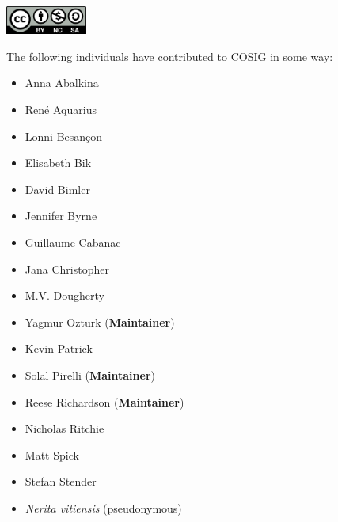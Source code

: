\documentclass[letterpaper, 12pt]{article}
\begin{document}
\includegraphics[width=0.2\textwidth]{img/home/Cc-by-nc-sa_icon.svg.png}

\pagebreak

The following individuals have contributed to COSIG in some way:

\begin{itemize}
    \setlength\itemsep{-0.5em}
    \item Anna Abalkina 
    \item Ren\'e Aquarius 
    \item Lonni Besan\c{c}on 
    \item Elisabeth Bik 
    \item David Bimler 
    \item Jennifer Byrne 
    \item Guillaume Cabanac 
    \item Jana Christopher 
    \item M.V. Dougherty 
    \item Yagmur Ozturk  (\textbf{Maintainer})
    \item Kevin Patrick 
    \item Solal Pirelli  (\textbf{Maintainer})
    \item Reese Richardson  (\textbf{Maintainer})
    \item Nicholas Ritchie 
    \item Matt Spick 
    \item Stefan Stender 
    \item \textit{Nerita vitiensis} (pseudonymous)
\end{itemize}
\end{document}
